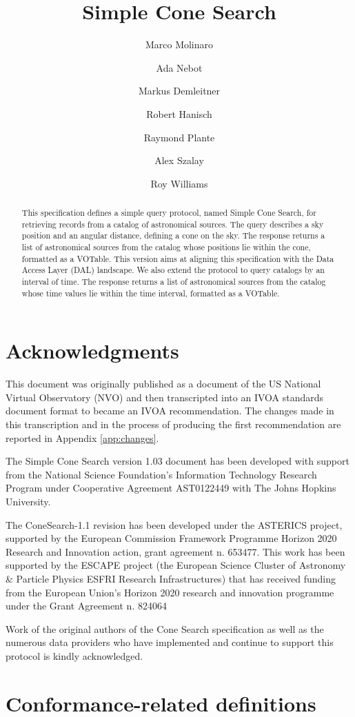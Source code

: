 \documentclass[11pt,a4paper]{ivoa}
\title{Simple Cone Search}
\author[http://www.ivoa.net/twiki/bin/view/IVOA/MarcoMolinaro]{Marco Molinaro}
\author[http://www.ivoa.net/twiki/bin/view/IVOA/AdaNebot]{Ada Nebot}
\author[http://www.ivoa.net/twiki/bin/view/IVOA/MarkusDemleitner]{Markus Demleitner}
\author[http://www.ivoa.net/twiki/bin/view/IVOA/BobHanisch]{Robert Hanisch}
\author[http://www.ivoa.net/twiki/bin/view/IVOA/RayPlante]{Raymond Plante}
\author[http://www.ivoa.net/twiki/bin/view/IVOA/AlexSzalay]{Alex Szalay}
\author[http://www.ivoa.net/twiki/bin/view/IVOA/RoyWilliams]{Roy Williams}
\begin{document}
 \begin{abstract} This specification defines a simple
query protocol, named Simple Cone Search, for retrieving records from a
catalog of astronomical sources.  The query describes a sky position and
an angular distance, defining a cone on the sky.  The response returns a
list of astronomical sources from the catalog whose positions lie within
the cone, formatted as a VOTable.  This version aims at aligning this
specification with the Data Access Layer (DAL) landscape.  We also
extend the protocol to query catalogs by an interval of time.  The
response returns a list of astronomical sources from the catalog whose
time values lie within the time interval, formatted as a
VOTable.


\end{abstract}


\section*{Acknowledgments} This document was originally published as a
document of the US National Virtual Observatory (NVO) 
and then transcripted into an
IVOA standards document format to became an IVOA recommendation. The
changes made in this transcription and in the process of producing the
first recommendation are reported in Appendix \ref{app:changes}.

The Simple Cone Search version 1.03 document has been developed with
support from the National Science Foundation's Information Technology
Research Program under Cooperative Agreement AST0122449 with The Johns
Hopkins University.

The ConeSearch-1.1 revision has been developed under the ASTERICS
project, supported by the European Commission Framework Programme
Horizon 2020 Research and Innovation action, grant agreement n. 653477.
This work has been supported by the ESCAPE project (the European Science
Cluster of Astronomy \& Particle Physics ESFRI Research Infrastructures)
that has received funding from the European Union’s Horizon 2020
research and innovation programme under the Grant Agreement n. 824064

Work of the original authors of the Cone Search specification as well as
the numerous data providers who have implemented and continue to support
this protocol is kindly acknowledged.

\section*{Conformance-related definitions}
\end{document}
